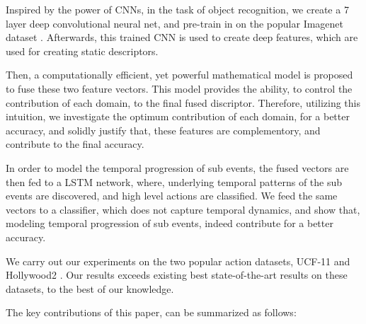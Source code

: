 Inspired by the power of CNNs, in the task of object recognition, we create a 7 layer deep
convolutional neural net, and pre-train in on the popular Imagenet dataset \cite{deng2012imagenet}.
Afterwards, this trained CNN is used to create deep features, which are used for creating static descriptors. 

Then, a computationally efficient, yet powerful mathematical model is proposed to fuse these 
two feature vectors. This model provides the ability, to control the contribution of each domain,
to the final fused discriptor. Therefore, utilizing this intuition, we investigate the 
optimum contribution of each domain, for a better accuracy, and solidly justify that, these 
features are complementory, and contribute to the final accuracy. 

In order to model the temporal progression of sub events, the fused vectors are then fed to 
a LSTM network, where, underlying temporal patterns of the sub events are discovered, and high level actions 
are classified. We feed the same vectors to a classifier, which does not capture temporal dynamics,
and show that, modeling temporal progression of sub events, indeed contribute for a better 
accuracy. 

We carry out our experiments on the two popular action datasets, UCF-11 \cite{liu2009recognizing}
and Hollywood2 \cite{marszalek2009actions}. Our results exceeds existing best state-of-the-art
results on these datasets, to the best of our knowledge.

The key contributions of this paper, can be summarized as follows:

